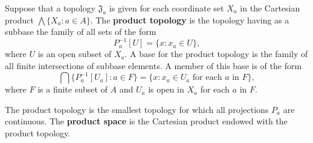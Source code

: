 Suppose that a topology $\mathfrak{J}_a$ is given for each coordinate set $X_a$ in the Cartesian product $\bigwedge \{X_a : a \in A\}$. The \textbf{product topology} is the topology having as a subbase the family of all sets of the form
$$P_a^{-1}[U] = \{x : x_a \in U\},$$
where $U$ is an open subset of $X_a$. A base for the product topology is the family of all finite intersections of subbase elements. A member of this base is of the form
$$\bigcap \{P_a^{-1}[U_a] : a \in F\} = \{x : x_a \in U_a \text{ for each } a \text{ in } F\},$$
where $F$ is a finite subset of $A$ and $U_a$ is open in $X_a$ for each $a$ in $F$.

The product topology is the smallest topology for which all projections $P_a$ are continuous. The \textbf{product space} is the Cartesian product endowed with the product topology.
